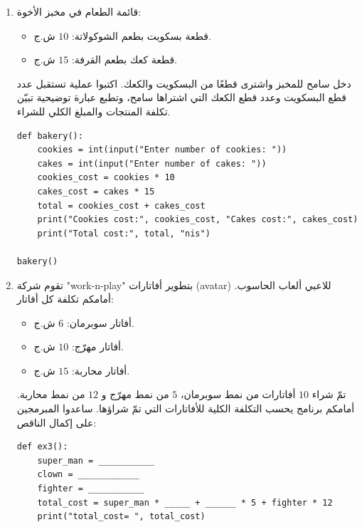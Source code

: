 \documentclass[14pt]{extarticle}
\begin{document}
\begin{enumerate}[resume, label=\textbf{تمرين \arabic*:}, wide=0pt, itemsep=2.2em]
\begin{boxSolution}
\begin{english}
\begin{verbatim}
ex2()
\end{verbatim}
\end{english}
\end{boxSolution}
\fi
\filbreak

\item قائمة الطعام في مخبز الأخوة:
\begin{itemize}
\item قطعة بسكويت بطعم الشوكولاتة: $10$ ش.ج.
\item قطعة كعك بطعم القرفة: $15$ ش.ج.
\end{itemize}
دخل سامح للمخبز واشترى قطعًا من البسكويت والكعك. اكتبوا عملية تستقبل عدد قطع البسكويت وعدد قطع الكعك التي اشتراها سامح، وتطبع عبارة توضيحية تبيّن تكلفة المنتجات والمبلغ الكلي للشراء.

\ifwithsols
\begin{boxSolution}
\begin{english}
\begin{verbatim}
def bakery():
    cookies = int(input("Enter number of cookies: "))
    cakes = int(input("Enter number of cakes: "))
    cookies_cost = cookies * 10
    cakes_cost = cakes * 15
    total = cookies_cost + cakes_cost
    print("Cookies cost:", cookies_cost, "Cakes cost:", cakes_cost)
    print("Total cost:", total, "nis")

bakery()
\end{verbatim}
\end{english}
\end{boxSolution}
\fi
\filbreak

\item تقوم شركة \textenglish{"work-n-play"} بتطوير أفاتارات (\textenglish{avatar}) للاعبي ألعاب الحاسوب. أمامكم تكلفة كل أفاتار:
\begin{itemize}
\item أفاتار سوبرمان: $6$ ش.ج.
\item أفاتار مهرّج: $10$ ش.ج.
\item أفاتار محاربة: $15$ ش.ج.
\end{itemize}
تمّ شراء $10$ أفاتارات من نمط سوبرمان، $5$ من نمط مهرّج و $12$ من نمط محاربة.
أمامكم برنامج يحسب التكلفة الكلية للأفاتارات التي تمّ شراؤها. ساعدوا المبرمجين على إكمال الناقص:

\begin{boxCode}
\begin{english}
\begin{verbatim}
def ex3():
    super_man = ___________
    clown = ____________
    fighter = ___________
    total_cost = super_man * _____ + ______ * 5 + fighter * 12
    print("total_cost= ", total_cost)


\end{verbatim}
\end{english}
\end{boxCode}
\end{enumerate}
\end{document}
